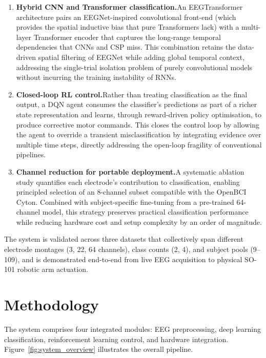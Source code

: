 \documentclass[12pt, a4paper]{article}
\begin{document}
\begin{enumerate}
    \item \textbf{Hybrid CNN and Transformer classification.}\quad An EEGTransformer architecture pairs an EEGNet-inspired convolutional front-end (which provides the spatial inductive bias that pure Transformers lack) with a multi-layer Transformer encoder that captures the long-range temporal dependencies that CNNs and CSP miss. This combination retains the data-driven spatial filtering of EEGNet while adding global temporal context, addressing the single-trial isolation problem of purely convolutional models without incurring the training instability of RNNs.

    \item \textbf{Closed-loop RL control.}\quad Rather than treating classification as the final output, a DQN agent consumes the classifier's predictions as part of a richer state representation and learns, through reward-driven policy optimisation, to produce corrective motor commands. This closes the control loop by allowing the agent to override a transient misclassification by integrating evidence over multiple time steps, directly addressing the open-loop fragility of conventional pipelines.

    \item \textbf{Channel reduction for portable deployment.}\quad A systematic ablation study quantifies each electrode's contribution to classification, enabling principled selection of an 8-channel subset compatible with the OpenBCI Cyton. Combined with subject-specific fine-tuning from a pre-trained 64-channel model, this strategy preserves practical classification performance while reducing hardware cost and setup complexity by an order of magnitude.
\end{enumerate}

The system is validated across three datasets that collectively span different electrode montages (3, 22, 64 channels), class counts (2, 4), and subject pools (9--109), and is demonstrated end-to-end from live EEG acquisition to physical SO-101 robotic arm actuation.

\section{Methodology}

The system comprises four integrated modules: EEG preprocessing, deep learning classification, reinforcement learning control, and hardware integration. Figure~\ref{fig:system_overview} illustrates the overall pipeline.
\end{document}
